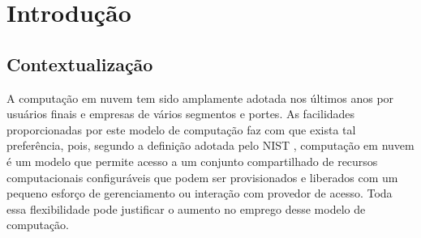 \chapter{\label{chap:intro}Introdução}




%
%
%
%

\section{Contextualização}

A computação em nuvem tem sido amplamente adotada nos últimos anos por usuários finais e empresas de vários segmentos e portes.
As facilidades proporcionadas por este modelo de computação faz com que exista tal preferência, pois, segundo a definição adotada
pelo NIST \cite{Mell:2011}, computação em nuvem é um modelo que permite acesso a um conjunto compartilhado de recursos computacionais configuráveis que podem ser provisionados e liberados  com um pequeno esforço de gerenciamento ou interação com provedor de acesso.
Toda essa flexibilidade pode justificar o aumento no emprego desse modelo de computação.

